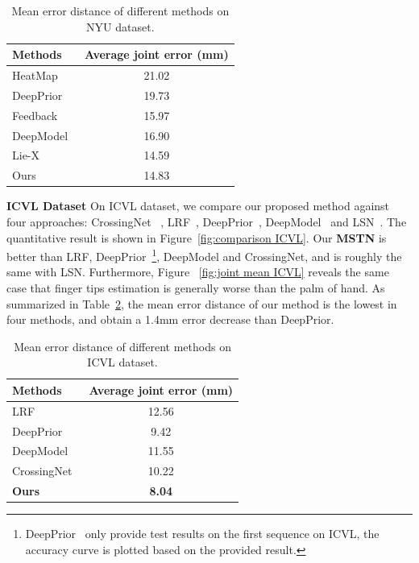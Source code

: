 \documentclass[journal,comsoc]{IEEEtran}
\let\MYoriglatexcaption\caption
\renewcommand{\caption}[2][\relax]{\MYoriglatexcaption[#2]{#2}}
\begin{document}
\begin{table}[htbp]
  \centering
  \caption{Mean error distance of different methods on NYU dataset.}
    \begin{tabular}{|l|c|}
    \hline
    Methods & \multicolumn{1}{l}{Average joint error (mm)} \\
    \hline
    HeatMap~\cite{tompson2014real} & 21.02 \\
    DeepPrior~\cite{oberweger2015hands} & 19.73 \\
    Feedback~\cite{oberweger2015training} & 15.97 \\
    DeepModel~\cite{zhou2016model} & 16.90 \\
    Lie-X~\cite{xu2017lie} & 14.59 \\
    Ours  & 14.83 \\
    \hline
    \end{tabular}%
  \label{tab:mean error NYU}%
\end{table}%
\textbf{ICVL Dataset}
On ICVL dataset, we compare our proposed method against four approaches: CrossingNet
~\cite{wan2017crossing}, LRF~\cite{tang2014latent}, DeepPrior~\cite{oberweger2015hands},
DeepModel~\cite{zhou2016model} and LSN~\cite{wan2016direction}. The quantitative result
is shown in Figure~\ref{fig:comparison ICVL}. Our \textbf{MSTN} is better than LRF,
DeepPrior~\footnote{DeepPrior~\cite{oberweger2015hands} only provide test results on
the first sequence on ICVL, the accuracy curve is plotted based on the provided result.},
DeepModel and CrossingNet, and is roughly the same with LSN. Furthermore, Figure
~\ref{fig:joint mean ICVL} reveals the same case that finger tips estimation is generally
worse than the palm of hand. As summarized in Table~\ref{tab:mean error ICVL}, the mean
error distance of our method is the lowest in four methods, and obtain a 1.4mm error
decrease than DeepPrior.

\begin{table}[htbp]
  \centering
  \caption{Mean error distance of different methods on ICVL dataset.}
    \begin{tabular}{|l|c|}\hline
    Methods & \multicolumn{1}{l}{Average joint error (mm)} \\\hline
    LRF~\cite{tang2014latent}   &  12.56\\
    DeepPrior~\cite{oberweger2015hands} &  9.42\\
    DeepModel~\cite{zhou2016model} &  11.55\\
    CrossingNet~\cite{wan2017crossing} &10.22\\
    \textbf{Ours}  &\textbf{8.04}\\
    \hline
    \end{tabular}%
  \label{tab:mean error ICVL}%
\end{table}%
\end{document}
